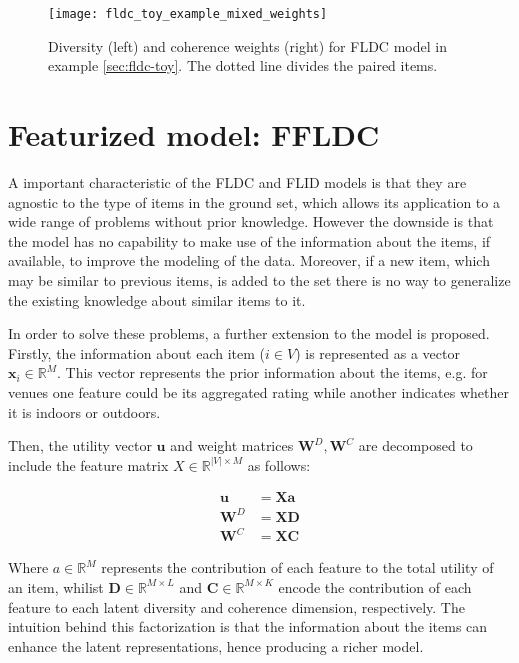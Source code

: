 \begin{figure}
  \centering
  \texttt{[image: fldc\_toy\_example\_mixed\_weights]}
  \caption{Diversity (left) and coherence weights (right) for FLDC model in example \ref{sec:fldc-toy}. The dotted line divides the paired items.}
  \label{fig:fldc-toy-mixed-weights}
\end{figure}


\section{Featurized model: FFLDC}

A important characteristic of the FLDC and FLID models is that they are agnostic to the type of items in the ground set, which allows its application to a wide range of problems without prior knowledge. However the downside is that the model has no capability to make use of the information about the items, if available, to improve the modeling of the data. Moreover, if a new item, which may be similar to previous items, is added to the set there is no way to generalize the existing knowledge about similar items to it.

In order to solve these problems, a further extension to the model is proposed. Firstly, the information about each item ($i \in V$) is represented as a vector $\mathbf{x}_{i} \in \mathbb{R}^{M}$. This vector represents the prior information about the items, e.g. for venues one feature could be its aggregated rating while another indicates whether it is indoors or outdoors.

Then, the utility vector $\mathbf{u}$ and weight matrices $\mathbf{W}^{D}, \mathbf{W}^{C}$ are decomposed to include the feature matrix $X \in \mathbb{R}^{|V| \times M}$ as follows:

\begin{align}
  \mathbf{u} &= \mathbf{Xa} \\
  \mathbf{W}^{D} &= \mathbf{XD} \\
  \mathbf{W}^{C} &= \mathbf{XC}
\end{align} 

Where $a \in \mathbb{R}^{M}$ represents the contribution of each feature to the total utility of an item, whilist $\mathbf{D} \in \mathbb{R}^{M \times L}$ and $\mathbf{C} \in \mathbb{R}^{M \times K}$ encode the contribution of each feature to each latent diversity and coherence dimension, respectively. The intuition behind this factorization is that the information about the items can enhance the latent representations, hence producing a richer model.

